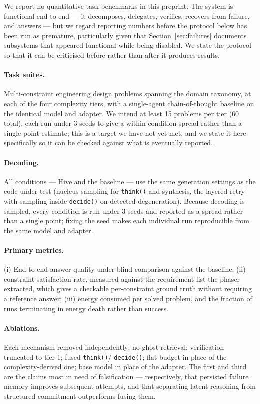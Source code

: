 \documentclass[11pt]{article}
\begin{document}
We report no quantitative task benchmarks in this preprint. The system is
functional end to end --- it decomposes, delegates, verifies, recovers from
failure, and answers --- but we regard reporting numbers before the protocol
below has been run as premature, particularly given that
Section~\ref{sec:failures} documents subsystems that appeared functional while
being disabled. We state the protocol so that it can be criticised before
rather than after it produces results.

\paragraph{Task suites.} Multi-constraint engineering design problems spanning
the domain taxonomy, at each of the four complexity tiers, with a
single-agent chain-of-thought baseline on the identical model and adapter. We
intend at least 15 problems per tier (60 total), each run under 3 seeds to
give a within-condition spread rather than a single point estimate; this is a
target we have not yet met, and we state it here specifically so it can be
checked against what is eventually reported.

\paragraph{Decoding.} All conditions --- Hive and the baseline --- use the
same generation settings as the code under test (nucleus sampling for
\texttt{think()} and synthesis, the layered retry-with-sampling inside
\texttt{decide()} on detected degeneration). Because decoding is sampled,
every condition is run under 3 seeds and reported as a spread rather than a
single point; fixing the seed makes each individual run reproducible from the
same model and adapter.

\paragraph{Primary metrics.} (i) End-to-end answer quality under blind
comparison against the baseline; (ii) constraint satisfaction rate, measured
against the requirement list the phaser extracted, which gives a checkable
per-constraint ground truth without requiring a reference answer; (iii) energy
consumed per solved problem, and the fraction of runs terminating in energy
death rather than success.

\paragraph{Ablations.} Each mechanism removed independently: no ghost
retrieval; verification truncated to tier 1; fused \texttt{think()}/%
\texttt{decide()}; flat budget in place of the complexity-derived one; base
model in place of the adapter. The first and third are the claims most in need
of falsification --- respectively, that persisted failure memory improves
subsequent attempts, and that separating latent reasoning from structured
commitment outperforms fusing them.
\end{document}
